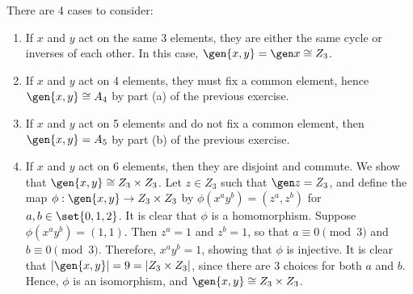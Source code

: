 \begin{sol}
    There are 4 cases to consider:
    \begin{enumerate}
        \item If $x$ and $y$ act on the same 3 elements, they are either the same cycle or inverses of each other. In this case, $\gen{x, y} = \gen x \cong Z_3$.
        \item If $x$ and $y$ act on 4 elements, they must fix a common element, hence $\gen{x, y} \cong A_4$ by part (a) of the previous exercise.
        \item If $x$ and $y$ act on 5 elements and do not fix a common element, then $\gen{x, y} = A_5$ by part (b) of the previous exercise.
        \item If $x$ and $y$ act on 6 elements, then they are disjoint and commute. We show that $\gen{x, y} \cong Z_3 \times Z_3$. Let $z \in Z_3$ such that $\gen z = Z_3$, and define the map $\phi : \gen{x, y} \to Z_3 \times Z_3$ by $\phi(x^a y^b) = (z^a, z^b)$ for $a, b \in \set{0, 1, 2}$. It is clear that $\phi$ is a homomorphism. Suppose $\phi(x^a y^b) = (1, 1)$. Then $z^a = 1$ and $z^b = 1$, so that $a \equiv 0 \pmod 3$ and $b \equiv 0 \pmod 3$. Therefore, $x^a y^b = 1$, showing that $\phi$ is injective. It is clear that $|\gen{x, y}| = 9 = |Z_3 \times Z_3|$, since there are 3 choices for both $a$ and $b$. Hence, $\phi$ is an isomorphism, and $\gen{x, y} \cong Z_3 \times Z_3$. \qh
    \end{enumerate}
\end{sol}
